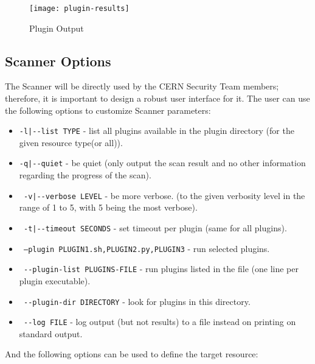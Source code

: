 \begin{figure}[h!]
  \centering
    \texttt{[image: plugin-results]}
  \caption{Plugin Output}
  \label{figure:plugin-results}
  
\end{figure}



\subsection{Scanner Options}
The Scanner will be directly used by the CERN Security Team members; therefore, it is important to design a robust user interface for it. The user can use the following options to customize Scanner parameters:

\begin{itemize}

\item 

    \texttt{-l|-{}-list TYPE} - list all plugins available in the plugin directory 
                       (for the given resource type(or all)).
\item    \texttt{-q|-{}-quiet} - be quiet (only output the scan result and no other information regarding the progress of the scan).
\item    \texttt{    -v|-{}-verbose LEVEL} - be more verbose. 
    	 				 (to the given verbosity level in the range of 1 to 5,
    	 				  with 5 being the most verbose).
\item    \texttt{    -t|-{}-timeout SECONDS} - set timeout per plugin (same for all plugins).
\item    \texttt{    --plugin PLUGIN1.sh,PLUGIN2.py,PLUGIN3} - run selected plugins.
\item    \texttt{ -{}-plugin-list PLUGINS-FILE} - run plugins listed in the file (one line per plugin executable).
\item    \texttt{  -{}-plugin-dir DIRECTORY} - look for plugins in this directory. %
\item    \texttt{    -{}-log FILE} - log output (but not results) to a file instead on printing on standard output.  
\end{itemize}
\clearpage
And the following options can be used to define the target resource:
